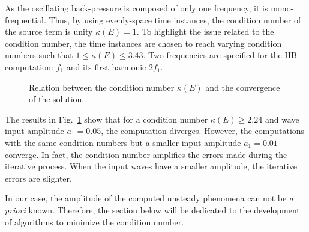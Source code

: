 As the oscillating back-pressure is composed of only one frequency,
it is mono-frequential.
Thus, by using evenly-space time instances, the condition
number of the source term is unity $\kappa (E) = 1$. 
To highlight the issue related to the condition number,
the time instances are chosen to reach varying condition numbers
such that $1 \leq \kappa (E) \leq 3.43$.  
Two frequencies are
specified for the HB computation: $f_1$ and its first harmonic
$2f_1$. 


\begin{figure}[htb!]
  \centering
  \caption{Relation between the condition number $\kappa (E)$ and the convergence of the solution.}
  \label{fig:canal_residual_vs_conditionning}
\end{figure}
The results in Fig.~\ref{fig:canal_residual_vs_conditionning} show that
for a condition number $\kappa (E) \geq 2.24$ and wave input amplitude
$a_1 = 0.05$, the computation diverges. However, the computations with
the same condition numbers but a smaller input amplitude $a_1 = 0.01$
converge. In fact, the condition number amplifies the errors made
during the iterative process. When the input waves have a smaller
amplitude, the iterative errors are slighter.

In our case, the amplitude of the computed unsteady phenomena can not
be \emph{a priori} known. Therefore, the section below will be dedicated to
the development of algorithms to minimize the condition number.

